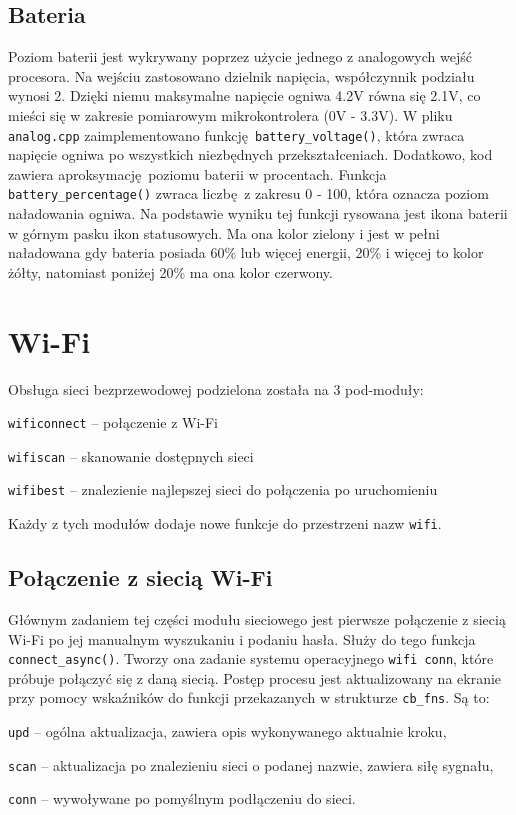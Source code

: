 \documentclass[12pt]{report}
\let\tempone\itemize
\let\temptwo\enditemize
\renewenvironment{itemize}{\tempone\setlength{\itemsep}{0cm}}{\temptwo}
\begin{document}
		\subsection{Bateria}
			Poziom baterii jest wykrywany poprzez użycie jednego z analogowych wejść procesora. Na wejściu zastosowano dzielnik napięcia, współczynnik podziału wynosi 2. Dzięki niemu maksymalne napięcie ogniwa 4.2V równa się 2.1V, co mieści się w zakresie pomiarowym mikrokontrolera (0V - 3.3V). W pliku \lstinline|analog.cpp| zaimplementowano funkcję \lstinline|battery_voltage()|, która zwraca napięcie ogniwa po wszystkich niezbędnych przekształceniach. Dodatkowo, kod zawiera aproksymację poziomu baterii w procentach. Funkcja \lstinline|battery_percentage()| zwraca liczbę z zakresu 0 - 100, która oznacza poziom naładowania ogniwa. Na podstawie wyniku tej funkcji rysowana jest ikona baterii w górnym pasku ikon statusowych. Ma ona kolor zielony i jest w pełni naładowana gdy bateria posiada 60\% lub więcej energii, 20\% i więcej to kolor żółty, natomiast poniżej 20\% ma ona kolor czerwony.
		
	\section{Wi-Fi}
		Obsługa sieci bezprzewodowej podzielona została na 3 pod-moduły:
		\begin{itemize}
			\item \lstinline|wificonnect| -- połączenie z Wi-Fi
			\item \lstinline|wifiscan| -- skanowanie dostępnych sieci
			\item \lstinline|wifibest| -- znalezienie najlepszej sieci do połączenia po uruchomieniu
		\end{itemize}
		
		Każdy z tych modułów dodaje nowe funkcje do przestrzeni nazw \lstinline|wifi|.
		
		\subsection{Połączenie z siecią Wi-Fi}
			Głównym zadaniem tej części modułu sieciowego jest pierwsze połączenie z siecią Wi-Fi po jej manualnym wyszukaniu i podaniu hasła. Służy do tego funkcja \lstinline|connect_async()|. Tworzy ona zadanie systemu operacyjnego \lstinline|wifi conn|, które próbuje połączyć się z daną siecią. Postęp procesu jest aktualizowany na ekranie przy pomocy wskaźników do funkcji przekazanych w strukturze \lstinline|cb_fns|. Są to:
			\begin{itemize}
				\item \lstinline|upd| -- ogólna aktualizacja, zawiera opis wykonywanego aktualnie kroku,
				\item \lstinline|scan| -- aktualizacja po znalezieniu sieci o podanej nazwie, zawiera siłę sygnału,
				\item \lstinline|conn| -- wywoływane po pomyślnym podłączeniu do sieci.
			\end{itemize}
			
\end{document}
